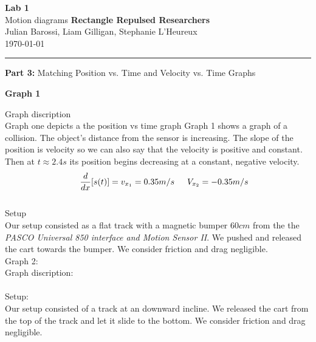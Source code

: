 \documentclass[12pt, letterpaper]{article}
\begin{document}
  \begin{titlepage} 
    \begin{center}
      \Huge{\textbf{Lab 1}}\\
      \Huge{Motion diagrams}
      \vfill
      \large{\textbf{Rectangle Repulsed Researchers}}\\
      \large{Julian Barossi, Liam Gilligan, Stephanie L'Heureux}\\
      \vspace*{0.5cm}
      \normalsize
      \today
    \end{center}
  \end{titlepage}

  \begin{center}
    \rule{\textwidth}{0.5pt}
    \normalsize{\textbf{Part 3:} Matching Position vs. Time and Velocity vs. Time Graphs}\\
    \vspace{0.5cm}
  \end{center}

  \begin{center}
    \Large\textbf{{Graph 1}}\\
  \end{center}


  \large{Graph discription}\\
  Graph one depicts a the position vs time graph 
  Graph 1 shows a graph of a collision. The object's distance from the sensor 
  is increasing. The slope of the position is velocity so we can also say 
  that the velocity is positive and constant. Then at $t\approx2.4s$ its position
  begins decreasing at a constant, negative velocity.\\ 
  \begin{equation} 
    \indent{} \frac{d}{dx}[s(t)] =  v_{x_1} = 0.35m/s
    \indent{}V_{x_2}= -0.35m/s
  \end{equation}\\
  \large{Setup}\\
  Our setup consisted as a flat track with a magnetic bumper $60cm$ from the
  the \emph{PASCO Universal 850 interface and Motion Sensor II}. We pushed and released the cart towards the bumper. 
  We consider friction and drag negligible.\\

  \large{Graph 2:}\\
  \large{Graph discription:}\\
  \\
  \large{Setup:}\\
  Our setup consisted of a track at an downward incline. We released the cart from the 
  top of the track and let it slide to the bottom. We consider friction and drag negligible.\\
\end{document}
